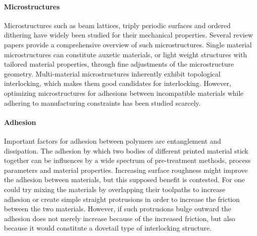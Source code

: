 \paragraph{Microstructures}
Microstructures such as beam lattices, triply periodic surfaces and ordered dithering have widely been studied for their mechanical properties.
Several review papers provide a comprehensive overview of such microstructures.\cite{Cadman2013,Zhang2018a,tamburrino2018}
Single material microstructures can constitute auxetic materials, %
or light weight structures with tailored material properties, through fine adjustments of the microstructure geometry. %
Multi-material microstructures inherently exhibit topological interlocking, which makes them good candidates for interlocking\cite{freund2019determination}.
However, optimizing microstructures for adhesions between incompatible materials while adhering to  manufacturing constraints has been studied scarcely.



\paragraph{Adhesion}

Important factors for adhesion between polymers are entanglement and dissipation\cite{abbott2015adhesion}.
The adhesion by which two bodies of different  printed material stick together can be influences by a wide spectrum of pre-treatment methods, process parameters and material properties\cite{freund2019determination}.
Increasing surface roughness might improve the adhesion between materials\cite{huttenbach1991interface,gent1990model}, but this supposed benefit is contested\cite{abbott2015adhesion}.
For  one could try mixing the materials by overlapping their toolpaths to increase adhesion or create simple straight protrusions in order to increase the friction between the two materials\cite{tamburrino19}.
However, if such protrusions bulge outward the adhesion does not merely increase because of the increased friction, but also because it would constitute a dovetail type of interlocking structure.



